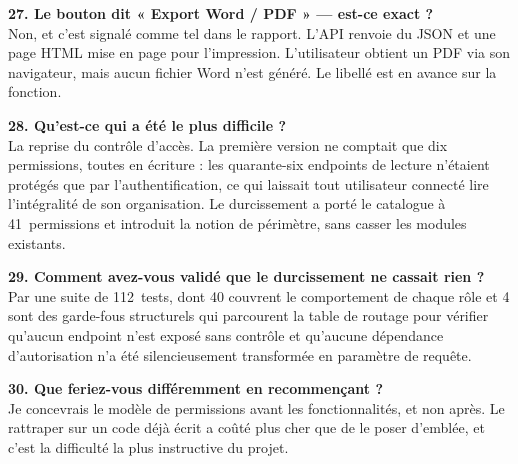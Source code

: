 \textbf{27. Le bouton dit « Export Word / PDF » — est-ce exact ?}\\
Non, et c'est signalé comme tel dans le rapport. L'API renvoie du JSON et une page HTML
mise en page pour l'impression. L'utilisateur obtient un PDF via son navigateur, mais
aucun fichier Word n'est généré. Le libellé est en avance sur la fonction.

\textbf{28. Qu'est-ce qui a été le plus difficile ?}\\
La reprise du contrôle d'accès. La première version ne comptait que dix permissions,
toutes en écriture : les quarante-six endpoints de lecture n'étaient protégés que par
l'authentification, ce qui laissait tout utilisateur connecté lire l'intégralité de son
organisation. Le durcissement a porté le catalogue à 41~permissions et introduit la
notion de périmètre, sans casser les modules existants.

\textbf{29. Comment avez-vous validé que le durcissement ne cassait rien ?}\\
Par une suite de 112~tests, dont 40 couvrent le comportement de chaque rôle et 4 sont
des garde-fous structurels qui parcourent la table de routage pour vérifier qu'aucun
endpoint n'est exposé sans contrôle et qu'aucune dépendance d'autorisation n'a été
silencieusement transformée en paramètre de requête.

\textbf{30. Que feriez-vous différemment en recommençant ?}\\
Je concevrais le modèle de permissions avant les fonctionnalités, et non après. Le
rattraper sur un code déjà écrit a coûté plus cher que de le poser d'emblée, et c'est
la difficulté la plus instructive du projet.
